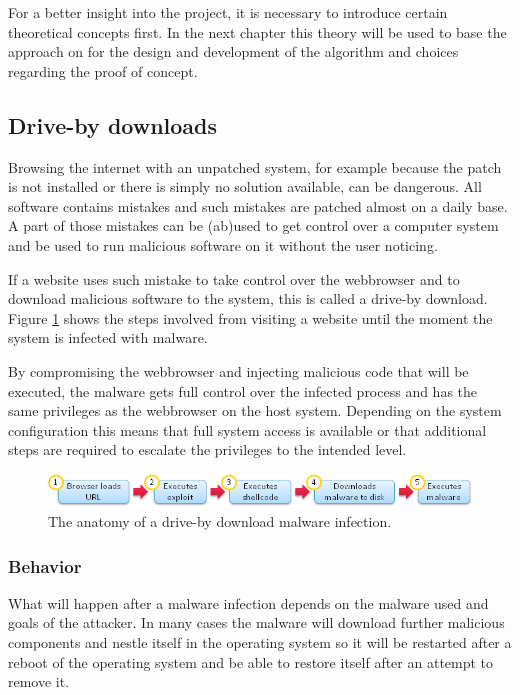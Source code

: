 For a better insight into the project, it is necessary to introduce certain theoretical concepts first. In the next chapter this theory will be used to base the approach on for the design and development of the algorithm and choices regarding the proof of concept.

\subsection{Drive-by downloads}

Browsing the internet with an unpatched system, for example because the patch is not installed or there is simply no solution available, can be dangerous. All software contains mistakes and such mistakes are patched almost on a daily base. A part of those mistakes can be (ab)used to get control over a computer system and be used to run malicious software on it without the user noticing.

If a website uses such mistake to take control over the webbrowser and to download malicious software to the system, this is called a drive-by download. Figure \ref{fig:dbdownload} shows the steps involved from visiting a website until the moment the system is infected with malware.

By compromising the webbrowser and injecting malicious code that will be executed, the malware gets full control over the infected process and has the same privileges as the webbrowser on the host system. Depending on the system configuration this means that full system access is available or that additional steps are required to escalate the privileges to the intended level.


\begin{figure}[h]
    \centering
    \includegraphics[width=12cm]{Images/drive-by-download.png}
    \caption{The anatomy of a drive-by download malware infection. \cite{http://blog.armorize.com/2011/04/newest-adobe-flash-0-day-used-in-new.html (modified)}}
    \label{fig:dbdownload}
\end{figure}

\subsubsection{Behavior}

What will happen after a malware infection depends on the malware used and goals of the attacker. In many cases the malware will download further malicious components and nestle itself in the operating system so it will be restarted after a reboot of the operating system and be able to restore itself after an attempt to remove it.

